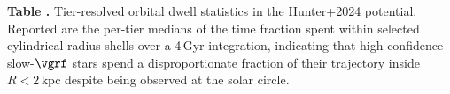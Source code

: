 \begin{center}
\label{tab:dwell}
\begin{minipage}{\columnwidth}
\small\textbf{Table \thetable.} Tier-resolved orbital dwell statistics
in the Hunter+2024 potential. Reported are the per-tier medians of
the time fraction spent within selected cylindrical radius shells
over a 4\,Gyr integration, indicating that high-confidence
slow-$\vgrf$ stars spend a disproportionate fraction of their
trajectory inside $R<2\,$kpc despite being observed at the solar
circle.
\end{minipage}
\vspace{0.4ex}

\scriptsize
\setlength{\tabcolsep}{4pt}
\end{center}
